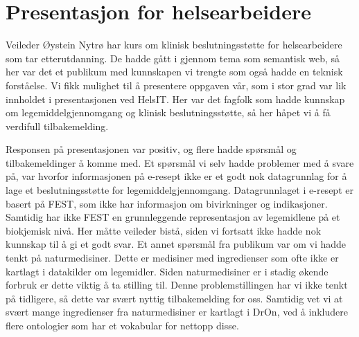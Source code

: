 \section{Presentasjon for helsearbeidere}
Veileder Øystein Nytrø har kurs om klinisk beslutningsstøtte for helsearbeidere som tar etterutdanning. De hadde gått i gjennom tema som semantisk web, så her var det et publikum med kunnskapen vi trengte som også hadde en teknisk forståelse. Vi fikk mulighet til å presentere oppgaven vår, som i stor grad var lik innholdet i presentasjonen ved HelsIT. Her var det fagfolk som hadde kunnskap om legemiddelgjennomgang og klinisk beslutningsstøtte, så her håpet vi å få verdifull tilbakemelding.

Responsen på presentasjonen var positiv, og flere hadde spørsmål og tilbakemeldinger å komme med. Et spørsmål vi selv hadde problemer med å svare på, var hvorfor informasjonen på e-resept ikke er et godt nok datagrunnlag for å lage et beslutningsstøtte for legemiddelgjennomgang. Datagrunnlaget i e-resept er basert på FEST, som ikke har informasjon om bivirkninger og indikasjoner. Samtidig har ikke FEST en grunnleggende representasjon av legemidlene på et biokjemisk nivå. Her måtte veileder bistå, siden vi fortsatt ikke hadde nok kunnskap til å gi et godt svar. Et annet spørsmål fra publikum var om vi hadde tenkt på naturmedisiner. Dette er medisiner med ingredienser som ofte ikke er kartlagt i datakilder om legemidler. Siden naturmedisiner er i stadig økende forbruk er dette viktig å ta stilling til. Denne problemstillingen har vi ikke tenkt på tidligere, så dette var svært nyttig tilbakemelding for oss. Samtidig vet vi at svært mange ingredienser fra naturmedisiner er kartlagt i DrOn, ved å inkludere flere ontologier som har et vokabular for nettopp disse.
